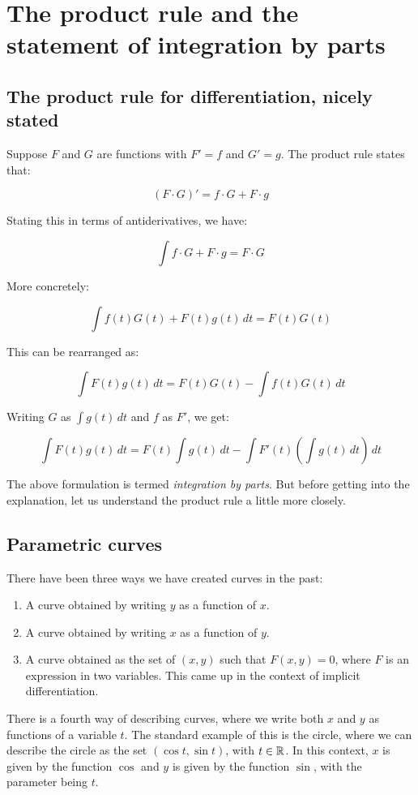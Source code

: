\documentclass{amsart}
\begin{document}
\section{The product rule and the statement of integration by parts}

\subsection{The product rule for differentiation, nicely stated}

Suppose $F$ and $G$ are functions with $F' = f$ and $G' = g$. The
product rule states that:

$$(F \cdot G)' = f \cdot G + F \cdot g$$

Stating this in terms of antiderivatives, we have:

$$\int f \cdot  G + F \cdot g = F \cdot G$$

More concretely:

$$\int f(t)G(t) + F(t)g(t) \, dt = F(t)G(t)$$

This can be rearranged as:

$$\int F(t)g(t) \, dt = F(t)G(t) - \int f(t)G(t) \, dt$$

Writing $G$ as $\int g(t) \, dt$ and $f$ as $F'$, we get:

$$\int F(t)g(t) \, dt = F(t)\int g(t) \, dt - \int F'(t) (\int g(t) \, dt) \, dt$$

The above formulation is termed {\em integration by parts}. But before
getting into the explanation, let us understand the product rule a
little more closely.

\subsection{Parametric curves}

There have been three ways we have created curves in the past:

\begin{enumerate}
\item A curve obtained by writing $y$ as a function of $x$.
\item A curve obtained by writing $x$ as a function of $y$.
\item A curve obtained as the set of $(x,y)$ such that $F(x,y) = 0$,
  where $F$ is an expression in two variables. This came up in the
  context of implicit differentiation.
\end{enumerate}

There is a fourth way of describing curves, where we write both $x$ and
$y$ as functions of a variable $t$. The standard example of this is
the circle, where we can describe the circle as the set $(\cos t, \sin
t)$, with $t \in \mathbb{R}$. In this context, $x$ is given by the function
$\cos$ and $y$ is given by the function $\sin$, with the parameter
being $t$.
\end{document}
